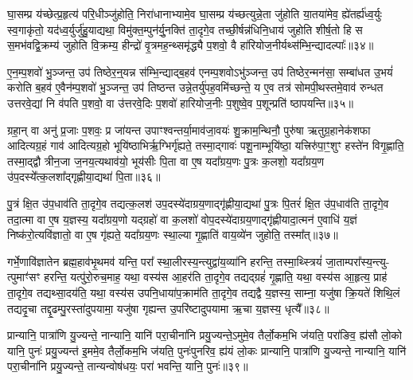 घा॒सम्प्र य॑च्छेत्प्र॒हृत्य॑ परि॒धीञ्जु॑होति॒ निरा॑धानाभ्यामे॒व घा॒सम्प्र य॑च्छत्युन्ने॒ता जु॑होति या॒तया॑मेव॒ ह्ये॑तर्\mbox{}ह्य॑ध्व॒र्युः स्व॒गाकृ॑तो॒ यद॑ध्व॒र्युर्जु॑हु॒याद्यथा॒ विमु॑क्त॒म्पुन॑र्यु॒नक्ति॑ ता॒दृगे॒व तच्छी॒र्\mbox{}षन्न॑धिनि॒धाय॑ जुहोति शीर्\mbox{}ष॒तो हि स स॒मभ॑वद्वि॒क्रम्य॑ जुहोति वि॒क्रम्य॒ हीन्द्रो॑ वृ॒त्रमह॒न्थ्समृ॑द्ध्यै प॒शवो॒ वै हा॑रियोज॒नीर्यथ्स॑म्भि॒न्द्यादल्पाः᳚॥३४॥

ए॒न॒म्प॒शवो॑ भु॒ञ्जन्त॒ उप॑ तिष्ठेर॒न्॒यन्न स॑म्भि॒न्द्याद्ब॒हव॑ एनम्प॒शवो\-ऽभु॑ञ्जन्त॒ उप॑ तिष्ठेर॒न्मन॑सा॒ सम्बा॑धत उ॒भयं॑ करोति ब॒हव॑ ए॒वैन॑म्प॒शवो॑ भु॒ञ्जन्त॒ उप॑ तिष्ठन्त उन्ने॒तर्यु॑पह॒वमि॑च्छन्ते॒ य ए॒व तत्र॑ सोमपी॒थस्तमे॒वाव॑ रुन्धत उत्तरवे॒द्यां नि व॑पति प॒शवो॒ वा उ॑त्तरवे॒दिः प॒शवो॑ हारियोज॒नीः प॒शुष्वे॒व प॒शून्प्रति॑ ष्ठापयन्ति॥३५॥

{\anuvakamend[{अ॒श्री॒णा॒द॒न्तरा॑धानाभ्या॒मल्पाः᳚ स्थापयन्ति॥९॥}]}

ग्रहा॒न् वा अनु॑ प्र॒जाः प॒शवः॒ प्र जा॑यन्त उपाꣳश्वन्तर्या॒माव॑जा॒वयः॑ शु॒क्राम॒न्थिनौ॒ पुरु॑षा ऋतुग्र॒हानेक॑शफा आदित्यग्र॒हं गाव॑ आदित्यग्र॒हो भूयि॑ष्ठाभिर्\mbox{}ऋ॒ग्भिर्गृ॑ह्यते॒ तस्मा॒द्गावः॑ पशू॒नाम्भूयि॑ष्ठा॒ यत्त्रिरु॑पा॒ꣳ॒शुꣳ हस्ते॑न विगृ॒ह्णाति॒ तस्मा॒द्द्वौ त्रीन॒जा ज॒नय॒त्यथाव॑यो॒ भूय॑सीः पि॒ता वा ए॒ष यदा᳚ग्रय॒णः पु॒त्रः क॒लशो॒ यदा᳚ग्रय॒ण उ॑प॒दस्ये᳚त्क॒लशा᳚द्गृह्णीया॒द्यथा॑ पि॒ता॥३६॥

पु॒त्रं क्षि॒त उ॑प॒धाव॑ति ता॒दृगे॒व तद्यत्क॒लश॑ उप॒दस्ये॑दाग्रय॒णाद्गृ॑ह्णीया॒द्यथा॑ पु॒त्रः पि॒तरं॑ क्षि॒त उ॑प॒धाव॑ति ता॒दृगे॒व तदा॒त्मा वा ए॒ष य॒ज्ञस्य॒ यदा᳚ग्रय॒णो यद्ग्रहो॑ वा क॒लशो॑ वोप॒दस्ये॑दाग्रय॒णाद्गृ॑ह्णीयादा॒त्मन॑ ए॒वाधि॑ य॒ज्ञं निष्क॑रो॒त्यवि॑ज्ञातो॒ वा ए॒ष गृ॑ह्यते॒ यदा᳚ग्रय॒णः स्था॒ल्या गृ॒ह्णाति॑ वाय॒व्ये॑न जुहोति॒ तस्मा᳚त्॥३७॥

गर्भे॒णावि॑ज्ञातेन ब्रह्म॒हाव॑भृ॒थमव॑ यन्ति॒ परा᳚ स्था॒लीरस्य॒न्त्युद्वा॑य॒व्या॑नि हरन्ति॒ तस्मा॒थ्स्त्रियं॑ जा॒ताम्परा᳚स्य॒न्त्यु- त्पुमाꣳ॑सꣳ हरन्ति॒ यत्पु॑रो॒रुच॒माह॒ यथा॒ वस्य॑स आ॒हर॑ति ता॒दृगे॒व तद्यद्ग्रहं॑ गृ॒ह्णाति॒ यथा॒ वस्य॑स आ॒हृत्य॒ प्राह॑ ता॒दृगे॒व तद्यथ्सा॒दय॑ति॒ यथा॒ वस्य॑स उपनि॒धाया॑प॒क्राम॑ति ता॒दृगे॒व तद्यद्वै य॒ज्ञस्य॒ साम्ना॒ यजु॑षा क्रि॒यते॑ शिथि॒लं तद्यदृ॒चा तद्दृ॒ढम्पु॒रस्ता॑दुपयामा॒ यजु॑षा गृह्यन्त उ॒परि॑ष्टादुपयामा ऋ॒चा य॒ज्ञस्य॒ धृत्यै᳚॥३८॥

{\anuvakamend[{यथा॑ पि॒ता तस्मा॑दप॒क्राम॑ति ता॒दृगे॒व तद्यद॒ष्टाद॑श च॥10॥}]}

प्रान्यानि॒ पात्रा॑णि यु॒ज्यन्ते॒ नान्यानि॒ यानि॑ परा॒चीना॑नि प्रयु॒ज्यन्ते॒\-ऽमुमे॒व तैर्लो॒कम॒भि ज॑यति॒ परा॑ङिव॒ ह्य॑सौ लो॒को यानि॒ पुनः॑ प्रयु॒ज्यन्त॑ इ॒ममे॒व तैर्लो॒कम॒भि ज॑यति॒ पुनः॑पुनरिव॒ ह्य॑यं लो॒कः प्रान्यानि॒ पात्रा॑णि यु॒ज्यन्ते॒ नान्यानि॒ यानि॑ परा॒चीना॑नि प्रयु॒ज्यन्ते॒ तान्यन्वोष॑धयः॒ परा॑ भवन्ति॒ यानि॒ पुनः॑॥३९॥

